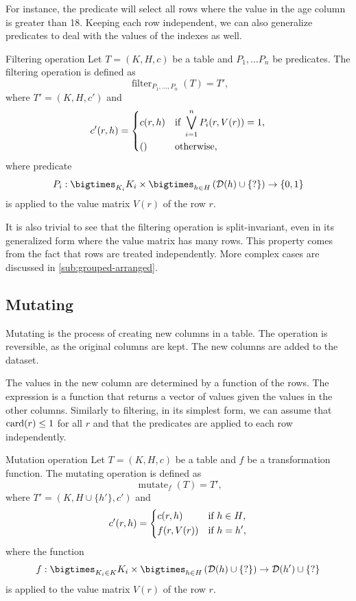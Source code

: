 For instance, the predicate  will select all rows where the value in the
age column is greater than 18.  Keeping each row independent, we can also generalize
predicates to deal with the values of the indexes as well.

\begin{definition}{Filtering operation}\label{def:filtering}
  Let $T = (K, H, c)$ be a table and $P_1, \dots P_n$ be predicates.  The
  filtering operation is defined as \[
    \operatorname{filter}_{P_1, \dots, P_n}(T) = T'\text{,}
  \] where $T' = (K, H, c')$ and \[
    c'(r, h) = \begin{dcases}
      c(r, h) & \text{if } \bigvee_{i = 1}^{n} P_i(r, V(r)) = 1\text{,} \\
      () & \text{otherwise}\text{,}
    \end{dcases}
  \] where predicate $$P_i : \bigtimes_{K_i} K_i \times
  \bigtimes_{h\in H}\left(\domainof{h} \cup \{?\}\right) \to \{0, 1\}$$ is applied to the value
  matrix $V(r)$ of the row $r$.
\end{definition}

It is also trivial to see that the filtering operation is split-invariant, even in its
generalized form where the value matrix has many rows.  This property comes from the fact
that rows are treated independently.  More complex cases are discussed in
\cref{sub:grouped-arranged}.

\subsection{Mutating}

Mutating is the process of creating new columns in a table.  The operation is reversible,
as the original columns are kept.  The new columns are added to the dataset.

The values in the new column are determined by a function of the rows.  The expression is
a function that returns a vector of values given the values in the other columns.
Similarly to filtering, in its simplest form, we can assume that $\rowcard[r] \leq 1$ for
all $r$ and that the predicates are applied to each row independently.

\begin{definition}{Mutation operation}\label{def:mutating}
  Let $T = (K, H, c)$ be a table and $f$ be a transformation function.  The mutating
  operation is defined as \[
    \operatorname{mutate}_{f}(T) = T'\text{,}
  \] where $T' = (K, H \cup \{ h' \}, c')$ and \[
    c'(r, h) = \begin{dcases}
      c(r, h) & \text{if } h \in H\text{,} \\
      f(r, V(r)) & \text{if } h = h'\text{,}
    \end{dcases}
  \] where the function $$f : \bigtimes_{K_i \in K} K_i \times \bigtimes_{h\in H}
  \left(\domainof{h} \cup \{?\}\right) \to \domainof{h'} \cup \{?\}$$ is applied to the
  value matrix $V(r)$ of the row $r$.
\end{definition}

